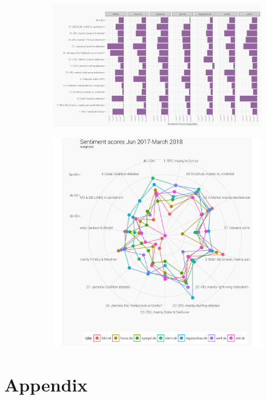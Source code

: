 \documentclass[12pt,a4paper,notitlepage]{article}
\begin{document}
\begin{figure}[H]
	\caption{Sentiment Score by news wire}
	\begin{center}
		\begin{subfigure}[normla]{\textwidth}
			\includegraphics[width=\textwidth,keepaspectratio]{../figs/sentscore_site.png}
			\label{fig_sentscore_site}
		\end{subfigure}
		\begin{subfigure}[normla]{0.7\textwidth}
			\includegraphics[width=\textwidth,keepaspectratio]{../figs/sentscore_radar.png}
			\label{fig_sentscore_radar}
		\end{subfigure}
		\end{center}
\end{figure}


\section*{Appendix}
\end{document}

